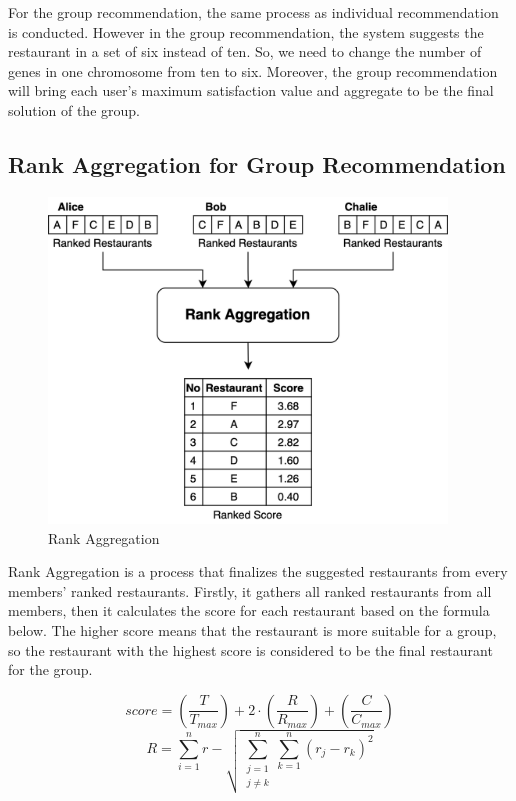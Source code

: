 \documentclass[12pt,oneside,openright,a4paper]{cpe-english-project}
\begin{document}
For the group recommendation, the same process as individual recommendation is conducted. However in the group recommendation, the system suggests the restaurant in a set of six instead of ten. So, we need to change the number of genes in one chromosome from ten to six. Moreover, the group recommendation will bring each user’s maximum satisfaction value and aggregate to be the final solution of the group.

\subsection{Rank Aggregation for Group Recommendation}


\begin{figure}[H]\centering
\includegraphics[width=300pt]{./images/3ga_rankagg.png}
\caption{Rank Aggregation}\label{fig:3ga_rankagg}
\end{figure}

Rank Aggregation is a process that finalizes the suggested restaurants from every members’ ranked restaurants. Firstly, it gathers all ranked restaurants from all members, then it calculates the score for each restaurant based on the formula below. The higher score means that the restaurant is more suitable for a group, so the restaurant with the highest score is considered to be the final restaurant for the group.

\begin{equation}\label{eq:rankaggscore}
score = \left (\frac{T}{T_{max}}  \right ) + 2\cdot \left (\frac{R}{R_{max}}  \right ) + \left (\frac{C}{C_{max}}  \right )
\end{equation}
\begin{equation}\label{eq:rankaggscorerank}
R = \sum_{i=1}^{n}r - \sqrt{\sum_{\substack{j=1 \\ j\neq k}}^{n}\sum_{k=1}^{n}(r_j - r_k)^2}
\end{equation}
\end{document}
